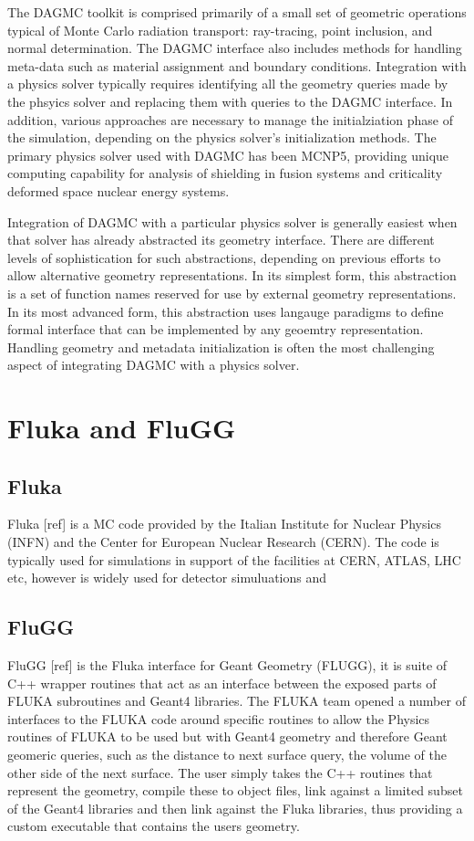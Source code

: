 \documentclass{anstrans}
\begin{document}
The DAGMC toolkit is comprised primarily of a small set of geometric
operations typical of Monte Carlo radiation transport: ray-tracing,
point inclusion, and normal determination.  The DAGMC interface also
includes methods for handling meta-data such as material assignment
and boundary conditions.  Integration with a physics solver typically
requires identifying all the geometry queries made by the phsyics
solver and replacing them with queries to the DAGMC interface.  In
addition, various approaches are necessary to manage the
initialziation phase of the simulation, depending on the physics
solver's initialization methods.  The primary physics solver used with
DAGMC has been MCNP5, providing unique computing capability for
analysis of shielding in fusion systems\cite{fusion3d} and criticality
deformed space nuclear energy systems\cite{nets}.

Integration of DAGMC with a particular physics solver is generally
easiest when that solver has already abstracted its geometry
interface.  There are different levels of sophistication for such
abstractions, depending on previous efforts to allow alternative
geometry representations.  In its simplest form, this abstraction is a
set of function names reserved for use by external geometry
representations.  In its most advanced form, this abstraction uses
langauge paradigms to define formal interface that can be implemented
by any geoemtry representation.  Handling geometry and metadata
initialization is often the most challenging aspect of integrating
DAGMC with a physics solver.

\section{Fluka and FluGG}
\subsection{Fluka}
Fluka [ref] is a MC code provided by the Italian Institute for Nuclear
 Physics (INFN) and the Center for European Nuclear Research (CERN). The
  code is typically used for simulations in support of the facilities at   CERN, ATLAS, LHC etc, however is widely used for detector 
simuluations and 
\subsection{FluGG}
FluGG [ref] is the Fluka interface for Geant Geometry (FLUGG), it is suite
 of C++ wrapper routines that act as an interface between the exposed 
 parts of FLUKA subroutines and Geant4 libraries. The FLUKA team opened a
 number of interfaces to the FLUKA code around specific routines to allow the Physics routines of FLUKA to be used but with Geant4 geometry and
  therefore Geant geomeric queries, such as the distance to next surface 
  query, the volume of the other side of the next surface. The user simply 
  takes the C++ routines that represent the geometry, compile these to 
  object files, link against a limited subset of the Geant4 libraries and
   then link against the Fluka libraries, thus providing a custom executable
   that contains the users geometry. 
\end{document}
